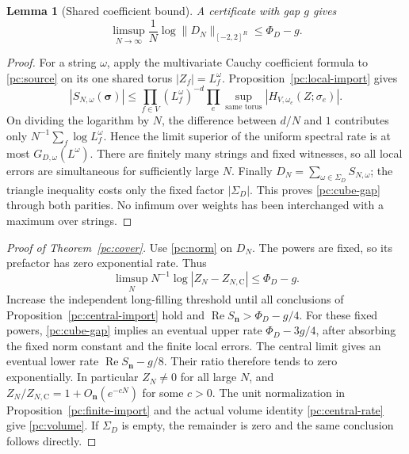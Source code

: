 \documentclass[11pt]{article}
\numberwithin{equation}{section}
\newtheorem{lemma}[theorem]{Lemma}
\theoremstyle{definition}\newtheorem{definition}[theorem]{Definition}
\theoremstyle{remark}\newtheorem{remark}[theorem]{Remark}
\newcommand{\Rea}{\operatorname{Re}}
\newcommand{\C}{\mathrm C}
\begin{document}
\begin{lemma}[Shared coefficient bound]\label{pc:remainder}
A certificate with gap \(g\) gives
\begin{equation}\label{pc:cube-gap}
 \limsup_{N\to\infty}\frac1N
          \log\|D_N\|_{[-2,2]^R}\le\Phi_D-g.
\end{equation}
\end{lemma}
\begin{proof}
For a string \(\omega\), apply the multivariate Cauchy coefficient
formula to \eqref{pc:source} on its one shared torus
\(|Z_f|=L_f^\omega\). Proposition~\ref{pc:local-import} gives
\[
 |S_{N,\omega}(\boldsymbol\sigma)|
 \le \prod_{f\in V}(L_f^\omega)^{-d}
       \prod_e\sup_{\text{same torus}}
                   |H_{V,\omega_e}(Z;\sigma_e)|.
\]
On dividing the logarithm by \(N\), the difference between \(d/N\)
and \(1\) contributes only
\(N^{-1}\sum_f\log L_f^\omega\). Hence the limit superior of the
uniform spectral rate is at most \(G_{D,\omega}(L^\omega)\).
There are finitely many strings and fixed witnesses, so all local
errors are simultaneous for sufficiently large \(N\). Finally
\(D_N=\sum_{\omega\in\Sigma_D}S_{N,\omega}\); the triangle
inequality costs only the fixed factor \(|\Sigma_D|\).
This proves \eqref{pc:cube-gap} through both parities. No infimum
over weights has been interchanged with a maximum over strings.
\end{proof}

\begin{proof}[Proof of Theorem~\ref{pc:cover}]
Use \eqref{pc:norm} on \(D_N\). The powers are fixed, so its prefactor
has zero exponential rate. Thus
\[
 \limsup_N N^{-1}\log|Z_N-Z_{N,\C}|\le\Phi_D-g.
\]
Increase the independent long-filling threshold until all conclusions
of Proposition~\ref{pc:central-import} hold and
\(\Rea S_{\boldsymbol n}>\Phi_D-g/4\). For these fixed powers,
\eqref{pc:cube-gap} implies an eventual upper rate
\(\Phi_D-3g/4\), after absorbing the fixed norm constant and the
finite local errors. The central limit gives an eventual lower
rate \(\Rea S_{\boldsymbol n}-g/8\). Their ratio therefore tends
to zero exponentially. In particular \(Z_N\ne0\) for all large \(N\),
and \(Z_N/Z_{N,\C}=1+O_{\boldsymbol n}(e^{-cN})\) for some \(c>0\).
The unit normalization in Proposition~\ref{pc:finite-import} and
the actual volume identity \eqref{pc:central-rate} give
\eqref{pc:volume}. If \(\Sigma_D\) is empty, the remainder is zero
and the same conclusion follows directly.
\end{proof}
\end{document}
